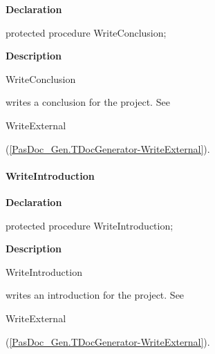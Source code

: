 \documentclass{report}
\newif\ifpdf
\begin{document}
\label{PasDoc_Gen.TDocGenerator-WriteConclusion}
\begin{list}{}{
\setlength{\itemindent}{0cm}
\setlength{\listparindent}{0cm}
\setlength{\leftmargin}{\evensidemargin}
\addtolength{\leftmargin}{\tmplength}
\settowidth{\labelsep}{X}
\addtolength{\leftmargin}{\labelsep}
\setlength{\labelwidth}{\tmplength}
}
\item[\textbf{Declaration}\hfill]
\ifpdf
\begin{flushleft}
\fi
\begin{ttfamily}
protected procedure WriteConclusion;\end{ttfamily}

\ifpdf
\end{flushleft}
\fi

\par
\item[\textbf{Description}]
\begin{ttfamily}WriteConclusion\end{ttfamily} writes a conclusion for the project. See \begin{ttfamily}WriteExternal\end{ttfamily}(\ref{PasDoc_Gen.TDocGenerator-WriteExternal}).

\end{list}
\paragraph*{WriteIntroduction}\hspace*{\fill}

\label{PasDoc_Gen.TDocGenerator-WriteIntroduction}
\begin{list}{}{
\setlength{\itemindent}{0cm}
\setlength{\listparindent}{0cm}
\setlength{\leftmargin}{\evensidemargin}
\addtolength{\leftmargin}{\tmplength}
\settowidth{\labelsep}{X}
\addtolength{\leftmargin}{\labelsep}
\setlength{\labelwidth}{\tmplength}
}
\item[\textbf{Declaration}\hfill]
\ifpdf
\begin{flushleft}
\fi
\begin{ttfamily}
protected procedure WriteIntroduction;\end{ttfamily}

\ifpdf
\end{flushleft}
\fi

\par
\item[\textbf{Description}]
\begin{ttfamily}WriteIntroduction\end{ttfamily} writes an introduction for the project. See \begin{ttfamily}WriteExternal\end{ttfamily}(\ref{PasDoc_Gen.TDocGenerator-WriteExternal}).

\end{list}
\end{document}
